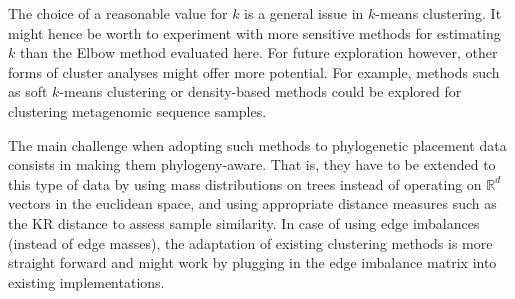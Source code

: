 The choice of a reasonable value for $k$ is a general issue in $k$-means clustering.
It might hence be worth to experiment with more sensitive methods for estimating $k$ than the Elbow method evaluated here.
For future exploration however, other forms of cluster analyses might offer more potential.
For example, methods such as soft $k$-means clustering \cite{Dunn1973,Bezdek1981} or density-based methods \cite{Kriegel2011}
could be explored for clustering metagenomic sequence samples.

The main challenge when adopting such methods to phylogenetic placement data consists in making them phylogeny-aware.
That is, they have to be extended to this type of data by
using mass distributions on trees instead of operating on $\mathbb{R}^d$ vectors in the euclidean space,
and using appropriate distance measures such as the KR distance to assess sample similarity.
In case of using edge imbalances (instead of edge masses),
the adaptation of existing clustering methods is more straight forward
and might work by plugging in the edge imbalance matrix into existing implementations.

